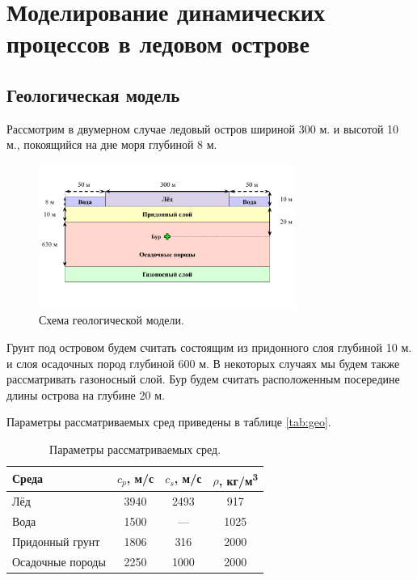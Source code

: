 \section{Моделирование динамических процессов в ледовом острове}

\subsection{Геологическая модель}

Рассмотрим в двумерном случае ледовый остров шириной 300 м. и высотой 10 м., покоящийся на дне моря глубиной 8 м.

\begin{figure}[htb]
    \centering
    \includegraphics[trim={0.5cm 3.5cm 0.5cm 2.0cm},clip,width=0.75\textwidth]{images/gas_field/gas_field_scheme.png}
    \caption{Схема геологической модели.}
    \label{fig:island}
\end{figure}

Грунт под островом будем считать состоящим из придонного слоя глубиной 10 м. и слоя осадочных пород глубиной 600 м. В некоторых случаях мы будем также рассматривать  газоносный слой. Бур будем считать расположенным посередине длины острова на глубине 20 м.

Параметры рассматриваемых сред приведены в таблице \autoref{tab:geo}.

\renewcommand{\arraystretch}{1.2}
\begin{table}[htb]
\centering
    \begin{tabular}{|l|c|c|c|}
    \hline
    Среда & $c_p$, м/с & $c_s$, м/с & $\rho$, кг/м\textsuperscript{3} \\ \hline
    Лёд & 3940 & 2493 & 917 \\ \hline
    Вода & 1500  & --- & 1025 \\ \hline
    Придонный грунт & 1806 & 316 & 2000 \\ \hline
    Осадочные породы & 2250 & 1000 & 2000 \\ \hline
    \end{tabular}
\caption{Параметры рассматриваемых сред.}
\label{tab:geo}
\end{table}
\renewcommand{\arraystretch}{1.0}

